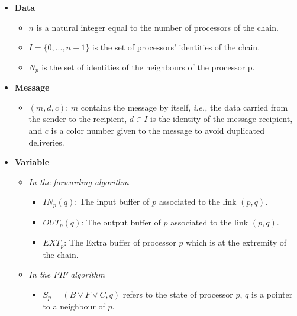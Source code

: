 \documentclass{llncs}
\newcommand{\ie}{\emph{i.e., }}
\begin{document}
\begin{itemize}
\item \textbf{Data}
           \begin{itemize}
            \item $n$ is a natural integer equal to the number of processors of the chain. 
            \item $I=\{0,...,n-1\}$ is the set of processors' identities of the chain. 
            \item $N_{p}$ is the set of identities of the neighbours of the processor p.   
           \end{itemize}
  \item \textbf{Message}
            \begin{itemize}
             \item $(m,d,c)$: $m$ contains the message by itself, \ie the data carried from the sender to the recipient,
                   $ d \in I$ is the identity of the message recipient, and
                   $c$ is a color number given to the message to avoid duplicated deliveries.
             \end{itemize}

  \item \textbf{Variable}
             \begin{itemize}
              \item \textit{In the forwarding algorithm}
                        \begin{itemize}
                         \item $IN_{p}(q)$: The input buffer of $p$ associated to the link $(p,q)$.
                         \item $OUT_{p}(q)$: The output buffer of $p$ associated to the link $(p,q)$.
                         \item $EXT_{p}$: The Extra buffer of processor $p$ which is at the extremity of the chain.
                         \end{itemize}
             \item{\textit{ In the PIF algorithm}}
                          \begin{itemize}
                            \item $S_{p}= (B \vee F \vee C,q)$ refers to the state of processor $p$, $q$ is a pointer
to a neighbour of $p$.\\
                           \end{itemize}
            \end{itemize}
            

\end{itemize}
\end{document}
